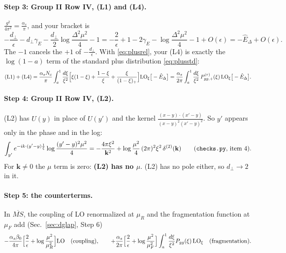 \documentclass[10pt]{article}
\numberwithin{equation}{section}
\newcommand{\LO}{{\rm LO}}
\begin{document}
\paragraph{Step 3: Group II Row IV, (L1) and (L4).} $\frac{g^2}{4\pi^2}=\frac{\alpha_s}{\pi}$, and your bracket is
\begin{equation}
-\frac{d_\perp}{\epsilon}-d_\perp\gamma_E-\frac{d_\perp}{2}\log\frac{\Delta^2\mu^2}{4}-1=-\frac{2}{\epsilon}+1-2\gamma_E-\log\frac{\Delta^2\mu^2}{4}-1+O(\epsilon)=-\hat E_\Delta+O(\epsilon).\label{eq:bracket}
\end{equation}
The $-1$ cancels the $+1$ of $-\frac{d_\perp}{\epsilon}$. With \eqref{eq:plusrel}, your (L4) is exactly the $\log(1-a)$ term of the standard plus distribution \eqref{eq:plusstd}:
\begin{equation}
({\rm L1})+({\rm L4})=\frac{\alpha_sN_c}{\pi}\int_a^1\frac{d\xi}{\xi^2}\Big[\xi(1-\xi)+\frac{1-\xi}{\xi}+\frac{\xi}{(1-\xi)_+}\Big]{\rm LO}_\xi\big[-\hat E_\Delta\big]=\frac{\alpha_s}{2\pi}\int_a^1\frac{d\xi}{\xi^2}\,P^{(r)}_{gg,+}(\xi)\,{\rm LO}_\xi\big[-\hat E_\Delta\big].\label{eq:L14}
\end{equation}

\paragraph{Step 4: Group II Row IV, (L2).} (L2) has $U(y)$ in place of $U(y')$ and the kernel $\frac{(x-y)\cdot(x'-y)}{(x-y)^2(x'-y)^2}$. So $y'$ appears only in the phase and in the log:
\begin{equation}
\int_{y'}e^{-ik\cdot(y'-y)\frac1\xi}\log\frac{(y'-y)^2\mu^2}{4}=-\frac{4\pi\xi^2}{\mathbf k^2}+\log\frac{\mu^2}{4}\,(2\pi)^2\xi^2\,\delta^{(2)}(\mathbf k)\qquad(\text{\texttt{checks.py}, item 4}).
\end{equation}
For $\mathbf k\neq0$ the $\mu$ term is zero: \textbf{(L2) has no $\mu$}. (L2) has no pole either, so $d_\perp\to2$ in it.

\paragraph{Step 5: the counterterms.} In $\overline{MS}$, the coupling of LO renormalized at $\mu_R$ and the fragmentation function at $\mu_F$ add (Sec.~\ref{sec:dglap}, Step 6)
\begin{equation}
-\frac{\alpha_s\beta_0}{4\pi}\Big[\frac{2}{\epsilon}+\log\frac{\mu^2}{\mu_R^2}\Big]\LO\quad\text{(coupling)},\qquad
+\frac{\alpha_s}{2\pi}\Big[\frac{2}{\epsilon}+\log\frac{\mu^2}{\mu_F^2}\Big]\int_a^1\frac{d\xi}{\xi^2}P_{gg}(\xi)\,{\rm LO}_\xi\quad\text{(fragmentation)}.\label{eq:cts}
\end{equation}
\end{document}
